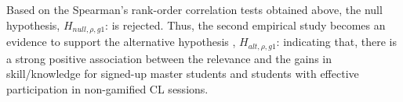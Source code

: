 Based on the Spearman's rank-order correlation tests obtained above, the null hypothesis, $H_{null,\rho,g1}$:  is rejected.
Thus, the second empirical study becomes an evidence to support the alternative hypothesis , $H_{alt,\rho,g1}$:  indicating that, there is a strong positive association between the relevance and the gains in skill/knowledge for signed-up master students and students with effective participation in non-gamified CL sessions.

